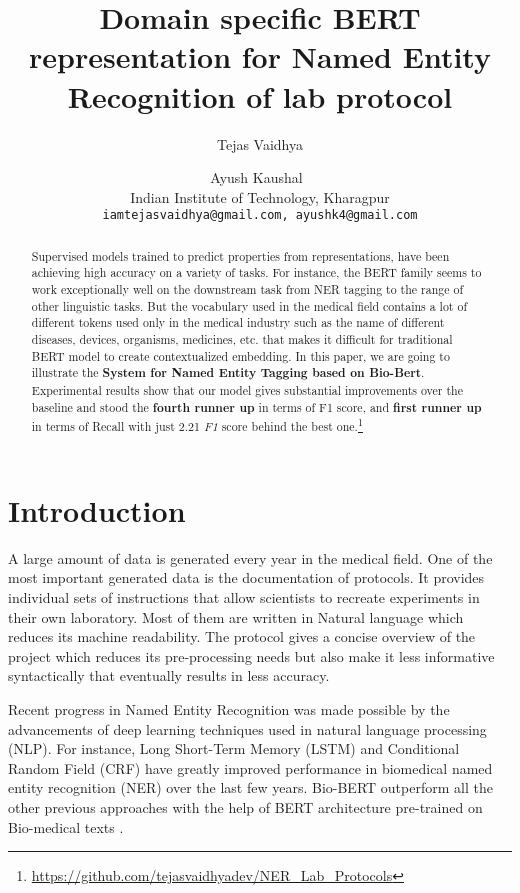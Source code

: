\documentclass[11pt,a4paper]{article}
\title{Domain specific BERT representation for Named Entity Recognition of lab protocol}
\author{Tejas Vaidhya \and Ayush Kaushal\ \\
  Indian Institute of Technology, Kharagpur \\
\texttt{iamtejasvaidhya@gmail.com, ayushk4@gmail.com} \\}
\date{}
\begin{document}
\maketitle
\begin{abstract}
Supervised models trained to predict properties from representations, have been achieving high accuracy on a variety of tasks. For instance, the BERT family seems to work exceptionally well on the downstream task from NER tagging to the range of other linguistic tasks. But the vocabulary used in the medical field contains a lot of different tokens used only in the medical industry such as the name of different diseases, devices, organisms, medicines, etc. that makes it difficult for traditional BERT model to create contextualized embedding. In this paper, we are going to illustrate the \textbf{System for Named Entity Tagging based on Bio-Bert}.
Experimental results show that our model gives substantial improvements over the baseline and stood the \textbf{fourth runner up} in terms of F1 score, and \textbf{first runner up} in terms of Recall with just 2.21 \textit{F1} score behind the best one.\footnote{\url{ https://github.com/tejasvaidhyadev/NER_Lab_Protocols}}

\end{abstract}
\section{Introduction}
A large amount of data is generated every year in the medical field. One of the most important generated data is the documentation of protocols. It provides individual sets of instructions that allow scientists to recreate experiments in their own laboratory. Most of them are written in Natural language which reduces its machine readability. The protocol gives a concise overview of the project which reduces its pre-processing needs but also make it less informative syntactically that eventually results in less accuracy. 

Recent progress in Named Entity Recognition was made possible by the advancements of deep learning techniques used in natural language processing (NLP). For instance, Long Short-Term Memory (LSTM) \cite{10.1162/neco.1997.9.8.1735} and Conditional Random Field (CRF) \cite{8244665}{} have greatly improved performance in biomedical named entity recognition (NER) over the last few years. Bio-BERT\citep{10.1093/bioinformatics/btz682} outperform all the other previous approaches with the help of BERT \citep{devlin2018pretraining} architecture pre-trained on Bio-medical texts \citep{10.1093/bioinformatics/bty449, 10.1093/bioinformatics/btx228, 10.1093/bioinformatics/bty869, article}.
\end{document}
